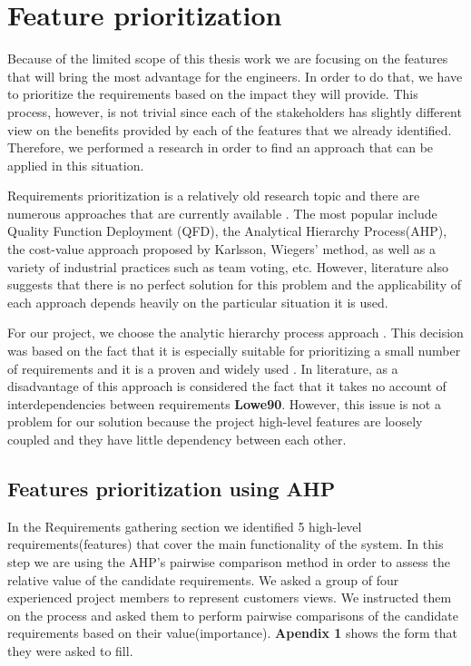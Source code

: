 \section{Feature prioritization}

Because of the limited scope of this thesis work we are focusing on the features that will bring the most advantage for the engineers. In order to do that, we have to prioritize the requirements based on the impact they will provide. This process, however, is not trivial since each of the stakeholders has slightly different view on the benefits provided by each of the features that we already identified. Therefore, we performed a research in order to find an approach that can be applied in this situation.

Requirements prioritization is a relatively old research topic and there are numerous approaches that are currently available \cite{Moisiadis}. The most popular include Quality Function Deployment (QFD), the Analytical Hierarchy Process(AHP), the cost-value approach proposed by Karlsson, Wiegers' method, as well as a variety of industrial practices such as team voting, etc. However, literature also suggests that there is no perfect solution for this problem and the applicability of each approach depends heavily on the particular situation it is used.

For our project, we choose the analytic hierarchy process approach \cite{Lowe90} . This decision was based on the fact that it is especially suitable for prioritizing a small number of requirements\cite{Karlsson} and it is a proven and widely used \cite{Karlsson2}. In literature, as a disadvantage of this approach is considered the fact that it takes no account of interdependencies between requirements \textbf{Lowe90}. However, this issue is not a problem for our solution because the project high-level features are loosely coupled and they have little dependency between each other. 


\subsection{Features prioritization using AHP}
In the Requirements gathering section we identified 5 high-level requirements(features) that cover the main functionality of the system. In this step we are using the AHP's pairwise comparison method in order to assess the relative value of the candidate requirements. We asked a group of four experienced project members to represent customers views. We instructed them on the process and asked them to perform  pairwise comparisons of the candidate requirements based on their value(importance). \textbf{Apendix 1} shows the form that they were asked to fill.

